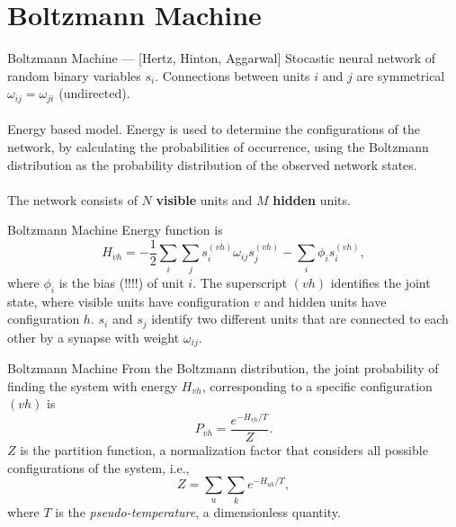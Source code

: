 \section{Boltzmann Machine}


\begin{frame}{Boltzmann Machine --- [Hertz, Hinton, Aggarwal]}%
    \justifying%
    Stocastic neural network of random binary variables $s_{i}$. Connections between units $i$ and $j$ are symmetrical $\omega_{ij} = \omega_{ji}$ (undirected).
    \\~\\
    Energy based model. Energy is used to determine the configurations of the network, by calculating the probabilities of occurrence, using the Boltzmann distribution as the probability distribution of the observed network states.
    \\~\\
    The network consists of $N$ \textbf{visible} units and $M$ \textbf{hidden} units.
       
\end{frame}


\begin{frame}{Boltzmann Machine}
    \justifying%
    Energy function is
    \begin{equation}
        \label{eq:energy-function-bm}
        H_{vh} = -\frac{1}{2} \sum_{i}\sum_{j} s^{(vh)}_{i} \omega_{ij} s^{(vh)}_{j} - \sum_{i} \phi_{i} s^{(vh)}_{i},
    \end{equation}
    where $\phi_{i}$ is the bias (!!!!) of unit $i$. The superscript $(vh)$ identifies the joint state, where visible units have configuration $v$ and hidden units have configuration $h$. $s_{i}$ and $s_{j}$ identify two different units that are connected to each other by a synapse with weight $\omega_{ij}$. 
\end{frame}


\begin{frame}{Boltzmann Machine}
    \justifying%
    From the Boltzmann distribution, the joint probability of finding the system with energy $H_{vh}$, corresponding to a specific configuration $(vh)$ is
    \begin{equation}
        \label{eq:joint-prob-bm}
        P_{vh} = \frac{e^{-H_{vh}/T}}{Z}.
    \end{equation}
    $Z$ is the partition function, a normalization factor that considers all possible configurations of the system, i.e.,
    \begin{equation}
        \label{eq:partition-function-bm}
        Z = \sum_{u} \sum_{k} e^{-H_{uk}/T},
    \end{equation}
    where $T$ is the \textit{pseudo-temperature}, a dimensionless quantity.
\end{frame}


